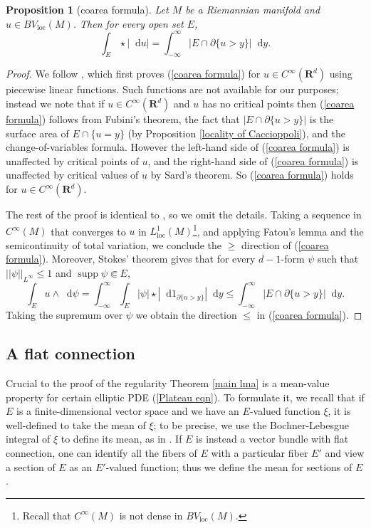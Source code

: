 \documentclass[reqno,12pt,letterpaper]{amsart}
\newcommand{\RR}{\mathbf{R}}
\DeclareMathOperator{\supp}{supp}
\newcommand*\dif{\mathop{}\!\mathrm{d}}
\newcommand{\loc}{\mathrm{loc}}
\newtheorem{proposition}[theorem]{Proposition}
\theoremstyle{definition}
\numberwithin{equation}{section}
\begin{document}
\begin{proposition}[coarea formula]\label{Coarea2}
Let $M$ be a Riemannian manifold and $u \in BV_\loc(M)$. Then for every open set $E$,
\begin{equation}\label{coarea formula}
\int_E \star |\dif u| = \int_{-\infty}^\infty |E \cap \partial \{u > y\}| \dif y.
\end{equation}
\end{proposition}
\begin{proof}
We follow \cite[Theorem 1.23]{Giusti77}, which first proves (\ref{coarea formula}) for $u \in C^\infty(\RR^d)$ using piecewise linear functions.
Such functions are not available for our purposes; instead we note that if $u \in C^\infty(\RR^d)$ and $u$ has no critical points then (\ref{coarea formula}) follows from Fubini's theorem, the fact that $|E \cap \partial \{u > y\}|$ is the surface area of $E \cap \{u = y\}$ (by Proposition \ref{locality of Caccioppoli}), and the change-of-variables formula.
However the left-hand side of (\ref{coarea formula}) is unaffected by critical points of $u$, and the right-hand side of (\ref{coarea formula}) is unaffected by critical values of $u$ by Sard's theorem.
So (\ref{coarea formula}) holds for $u \in C^\infty(\RR^d)$.

The rest of the proof is identical to \cite[Theorem 1.23]{Giusti77}, so we omit the details.
Taking a sequence in $C^\infty(M)$ that converges to $u$ in $L^1_\loc(M)$\footnote{Recall that $C^\infty(M)$ is not dense in $BV_\loc(M)$.}, and applying Fatou's lemma and the semicontinuity of total variation, we conclude the $\geq$ direction of (\ref{coarea formula}).
Moreover, Stokes' theorem gives that for every $d-1$-form $\psi$ such that $||\psi||_{L^\infty} \leq 1$ and $\supp \psi \Subset E$,
$$\int_E u \wedge \dif \psi = \int_{-\infty}^\infty \int_E |\psi| \star |\dif 1_{\partial \{u > y\}}| \dif y \leq \int_{-\infty}^\infty |E \cap \partial \{u > y\}| \dif y.$$
Taking the supremum over $\psi$ we obtain the direction $\leq$ in (\ref{coarea formula}).
\end{proof}

\subsection{A flat connection}
Crucial to the proof of the regularity Theorem \ref{main lma} is a mean-value property for certain elliptic PDE (\ref{Plateau eqn}).
To formulate it, we recall that if $E$ is a finite-dimensional vector space and we have an $E$-valued function $\xi$, it is well-defined to take the mean of $\xi$; to be precise, we use the Bochner-Lebesgue integral of $\xi$ to define its mean, as in \cite{Rieffel70}.
If $E$ is instead a vector bundle with flat connection, one can identify all the fibers of $E$ with a particular fiber $E'$ and view a section of $E$ as an $E'$-valued function; thus we define the mean for sections of $E$.
\end{document}
